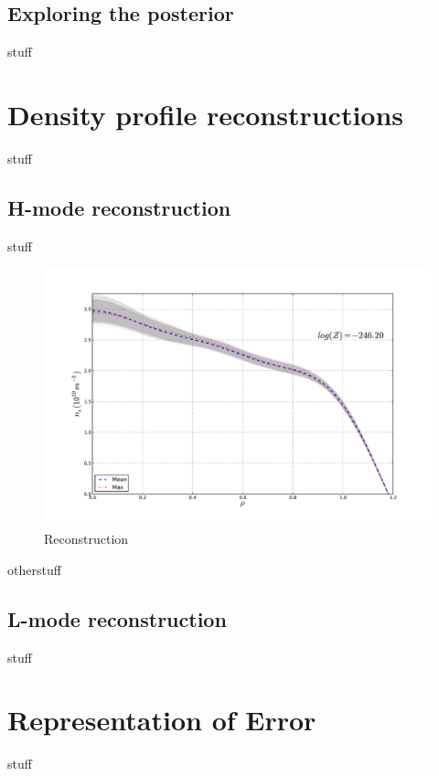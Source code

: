 \documentclass[12pt]{article}
\numberwithin{equation}{section}
\begin{document}
\subsection{Exploring the posterior}
stuff
\section{Density profile reconstructions}
stuff
\subsection{H-mode reconstruction}
stuff
\begin{figure}[ht]
	\centering
	\includegraphics[width=12cm,keepaspectratio=true]{figures/bfit146102_00505_all5}
	\vspace{-30pt}
	\caption{Reconstruction}
\end{figure}
otherstuff
\subsection{L-mode reconstruction}
stuff
\section{Representation of Error}
stuff
\end{document}
